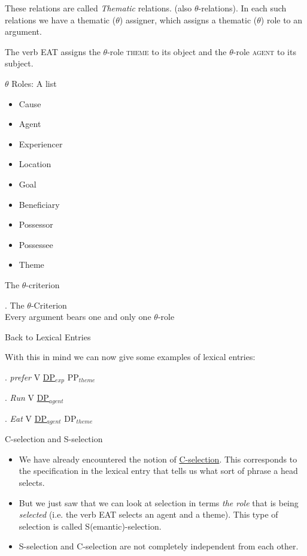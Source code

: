 \begin{frame}
  These relations are called \textit{Thematic} relations. (also $\theta$-relations).  In each such relations we have a thematic ($\theta$) assigner, which assigns a thematic ($\theta$) role to an argument.

The verb EAT assigns the $\theta$-role \textsc{theme} to its object and the $\theta$-role \textsc{agent} to its subject.
\end{frame}

\begin{frame}
  {$\theta$ Roles:  A list}

  \begin{itemize}
  \item Cause
  \item Agent
  \item Experiencer
  \item Location
  \item Goal
  \item Beneficiary
  \item Possessor
  \item Possessee
  \item Theme
  \end{itemize}

\end{frame}

\begin{frame}
  {The $\theta$-criterion}

\ex.
The $\theta$-Criterion\\
Every argument bears one and only one $\theta$-role

\end{frame}


\begin{frame}
  {Back to Lexical Entries}

With this in mind we can now give some examples of lexical entries:

\ex.
\textit{prefer} V  \underline{DP$_{exp}$} PP$_{theme}$

\ex.
\textit{Run} V  \underline{DP$_{agent}$}

\ex.
\textit{Eat} V  \underline{DP$_{agent}$} DP$_{theme}$


\end{frame}



\begin{frame}
  {C-selection and S-selection}

\begin{itemize}
\item We have already encountered the notion of \underline{C-selection}.  This corresponds to the specification in the lexical entry that tells us what sort of phrase a head selects.  \pause
\item But we just saw that we can look at selection in terms \textit{the role} that is being \textit{selected} (i.e. the verb EAT selects an agent and a theme).  This type of selection is called S(emantic)-selection. \pause
\item S-selection and C-selection are not completely independent from each other.
\end{itemize}
\end{frame}



